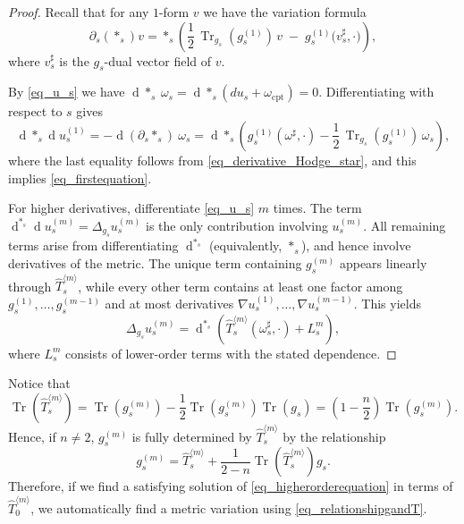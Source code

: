 \documentclass[11pt]{amsart}
\newcommand{\Tr}{\operatorname{Tr}}
\renewcommand{\d}{\operatorname{d}}
\begin{document}
\begin{proof}
	Recall that for any $1$-form $v$ we have the variation formula
	\begin{equation}\label{eq_derivative_Hodge_star}
		\partial_s(*_s)v
		=
		*_s\!\left(\frac12\,\Tr_{g_s}(g_s^{(1)})\,v\;-\; g_s^{(1)}\!\big(v_s^\sharp,\cdot\big)\right),
	\end{equation}
	where $v_s^\sharp$ is the $g_s$-dual vector field of $v$.
	
	By \eqref{eq_u_s} we have $\d *_s \:\omega_s = \d*_s(du_s+\omega_{\mathrm{cpt}})=0$.
	Differentiating with respect to $s$ gives
	\[
	\d*_s \d u_s^{(1)}
	=
	- \d(\partial_s*_s)\:\omega_s
	=
	\d*_s\!\left(g_s^{(1)}(\omega^\sharp,\cdot)-\frac12\,\Tr_{g_s}(g_s^{(1)})\,\omega_s\right),
	\]
	where the last equality follows from \eqref{eq_derivative_Hodge_star}, and this implies \eqref{eq_firstequation}.

	For higher derivatives, differentiate \eqref{eq_u_s} $m$ times.
	The term $\d^{*_s}\!\d u_s^{(m)}=\Delta_{g_s}u_s^{(m)}$ is the only contribution involving $u_s^{(m)}$.
	All remaining terms arise from differentiating $\d^{*_s}$ (equivalently, $*_s$), and hence involve derivatives of the metric.
	The unique term containing $g_s^{(m)}$ appears linearly through $\widehat T^{\langle m\rangle}_s$,
	while every other term contains at least one factor among $g_s^{(1)},\ldots,g_s^{(m-1)}$ and at most derivatives
	$\nabla u_s^{(1)},\ldots,\nabla u_s^{(m-1)}$.
	This yields
	\begin{equation}
		\label{eq_higher_order_equations}
			\Delta_{g_s}u_s^{(m)}
		=
		\d^{*_s}\!\left(\widehat T^{\langle m\rangle}_s(\omega_s^\sharp,\cdot)+L^m_s\right),
	\end{equation}
	where $L^m_s$ consists of lower-order terms with the stated dependence.
\end{proof}

Notice that
$$
\Tr(\widehat{T}^{\langle m \rangle}_s) = \Tr(g^{(m)}_s) - \frac{1}{2} \Tr(g^{(m)}_s) \Tr(g_s) = \left(1 - \frac{n}{2}\right) \Tr(g^{(m)}_s).
$$
Hence, if $n \not = 2$, $g^{(m)}_s$ is fully determined by $\widehat{T}^{\langle m \rangle}_s$ by the relationship
\begin{equation}
	\label{eq_relationshipgandT}
	g^{(m)}_s = \widehat{T}^{\langle m \rangle}_s + \frac{1}{2-n}\Tr(\widehat{T}^{\langle m \rangle}_s) g_s.
\end{equation}
Therefore, if we find a satisfying solution of \eqref{eq_higherorderequation} in terms of $\widehat{T}^{\langle m \rangle}_0$, we automatically find a metric variation using \eqref{eq_relationshipgandT}. 
\end{document}
